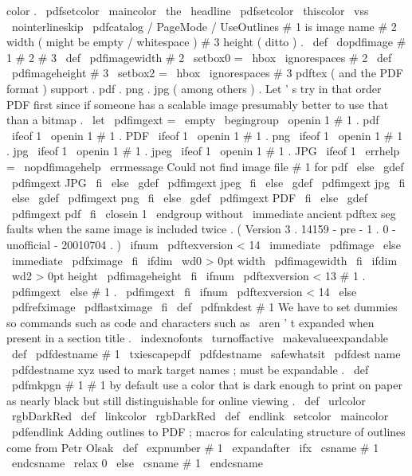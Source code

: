 {{{{color
.
\
pdfsetcolor
{
\
maincolor
}
\
the
\
headline
\
pdfsetcolor
{
\
thiscolor
}
%
}
%
\
vss
}
%
\
nointerlineskip
}
%
%
\
pdfcatalog
{
/
PageMode
/
UseOutlines
}
%
%
#
1
is
image
name
#
2
width
(
might
be
empty
/
whitespace
)
#
3
height
(
ditto
)
.
\
def
\
dopdfimage
#
1
#
2
#
3
{
%
\
def
\
pdfimagewidth
{
#
2
}
\
setbox0
=
\
hbox
{
\
ignorespaces
#
2
}
%
\
def
\
pdfimageheight
{
#
3
}
\
setbox2
=
\
hbox
{
\
ignorespaces
#
3
}
%
%
%
pdftex
(
and
the
PDF
format
)
support
.
pdf
.
png
.
jpg
(
among
%
others
)
.
Let
'
s
try
in
that
order
PDF
first
since
if
%
someone
has
a
scalable
image
presumably
better
to
use
that
than
a
%
bitmap
.
\
let
\
pdfimgext
=
\
empty
\
begingroup
\
openin
1
#
1
.
pdf
\
ifeof
1
\
openin
1
#
1
.
PDF
\
ifeof
1
\
openin
1
#
1
.
png
\
ifeof
1
\
openin
1
#
1
.
jpg
\
ifeof
1
\
openin
1
#
1
.
jpeg
\
ifeof
1
\
openin
1
#
1
.
JPG
\
ifeof
1
\
errhelp
=
\
nopdfimagehelp
\
errmessage
{
Could
not
find
image
file
#
1
for
pdf
}
%
\
else
\
gdef
\
pdfimgext
{
JPG
}
%
\
fi
\
else
\
gdef
\
pdfimgext
{
jpeg
}
%
\
fi
\
else
\
gdef
\
pdfimgext
{
jpg
}
%
\
fi
\
else
\
gdef
\
pdfimgext
{
png
}
%
\
fi
\
else
\
gdef
\
pdfimgext
{
PDF
}
%
\
fi
\
else
\
gdef
\
pdfimgext
{
pdf
}
%
\
fi
\
closein
1
\
endgroup
%
%
without
\
immediate
ancient
pdftex
seg
faults
when
the
same
image
is
%
included
twice
.
(
Version
3
.
14159
-
pre
-
1
.
0
-
unofficial
-
20010704
.
)
\
ifnum
\
pdftexversion
<
14
\
immediate
\
pdfimage
\
else
\
immediate
\
pdfximage
\
fi
\
ifdim
\
wd0
>
0pt
width
\
pdfimagewidth
\
fi
\
ifdim
\
wd2
>
0pt
height
\
pdfimageheight
\
fi
\
ifnum
\
pdftexversion
<
13
#
1
.
\
pdfimgext
\
else
{
#
1
.
\
pdfimgext
}
%
\
fi
\
ifnum
\
pdftexversion
<
14
\
else
\
pdfrefximage
\
pdflastximage
\
fi
}
%
\
def
\
pdfmkdest
#
1
{
{
%
%
We
have
to
set
dummies
so
commands
such
as
code
and
characters
%
such
as
\
aren
'
t
expanded
when
present
in
a
section
title
.
\
indexnofonts
\
turnoffactive
\
makevalueexpandable
\
def
\
pdfdestname
{
#
1
}
%
\
txiescapepdf
\
pdfdestname
\
safewhatsit
{
\
pdfdest
name
{
\
pdfdestname
}
xyz
}
%
}
}
%
%
used
to
mark
target
names
;
must
be
expandable
.
\
def
\
pdfmkpgn
#
1
{
#
1
}
%
%
by
default
use
a
color
that
is
dark
enough
to
print
on
paper
as
%
nearly
black
but
still
distinguishable
for
online
viewing
.
\
def
\
urlcolor
{
\
rgbDarkRed
}
\
def
\
linkcolor
{
\
rgbDarkRed
}
\
def
\
endlink
{
\
setcolor
{
\
maincolor
}
\
pdfendlink
}
%
%
Adding
outlines
to
PDF
;
macros
for
calculating
structure
of
outlines
%
come
from
Petr
Olsak
\
def
\
expnumber
#
1
{
\
expandafter
\
ifx
\
csname
#
1
\
endcsname
\
relax
0
%
\
else
\
csname
#
1
\
endcsname
}}
